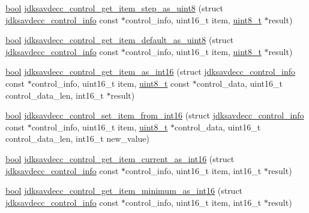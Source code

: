\begin{DoxyCompactItemize}
\item 
\hyperlink{avb__gptp_8h_af6a258d8f3ee5206d682d799316314b1}{bool} \hyperlink{group__aem__control__value__helpers_gad3f88597b663413b8204946fae28038c}{jdksavdecc\+\_\+control\+\_\+get\+\_\+item\+\_\+step\+\_\+as\+\_\+uint8} (struct \hyperlink{structjdksavdecc__control__info}{jdksavdecc\+\_\+control\+\_\+info} const $\ast$control\+\_\+info, uint16\+\_\+t item, \hyperlink{stdint_8h_aba7bc1797add20fe3efdf37ced1182c5}{uint8\+\_\+t} $\ast$result)
\item 
\hyperlink{avb__gptp_8h_af6a258d8f3ee5206d682d799316314b1}{bool} \hyperlink{group__aem__control__value__helpers_ga26f09817f181fa3492aac0c48be4594e}{jdksavdecc\+\_\+control\+\_\+get\+\_\+item\+\_\+default\+\_\+as\+\_\+uint8} (struct \hyperlink{structjdksavdecc__control__info}{jdksavdecc\+\_\+control\+\_\+info} const $\ast$control\+\_\+info, uint16\+\_\+t item, \hyperlink{stdint_8h_aba7bc1797add20fe3efdf37ced1182c5}{uint8\+\_\+t} $\ast$result)
\item 
\hyperlink{avb__gptp_8h_af6a258d8f3ee5206d682d799316314b1}{bool} \hyperlink{group__aem__control__value__helpers_ga62b54c4e6e3bea497cedd310f3c93012}{jdksavdecc\+\_\+control\+\_\+get\+\_\+item\+\_\+as\+\_\+int16} (struct \hyperlink{structjdksavdecc__control__info}{jdksavdecc\+\_\+control\+\_\+info} const $\ast$control\+\_\+info, uint16\+\_\+t item, \hyperlink{stdint_8h_aba7bc1797add20fe3efdf37ced1182c5}{uint8\+\_\+t} const $\ast$control\+\_\+data, uint16\+\_\+t control\+\_\+data\+\_\+len, int16\+\_\+t $\ast$result)
\item 
\hyperlink{avb__gptp_8h_af6a258d8f3ee5206d682d799316314b1}{bool} \hyperlink{group__aem__control__value__helpers_ga08c813f8d11cdc66b3524c523d40f5da}{jdksavdecc\+\_\+control\+\_\+set\+\_\+item\+\_\+from\+\_\+int16} (struct \hyperlink{structjdksavdecc__control__info}{jdksavdecc\+\_\+control\+\_\+info} const $\ast$control\+\_\+info, uint16\+\_\+t item, \hyperlink{stdint_8h_aba7bc1797add20fe3efdf37ced1182c5}{uint8\+\_\+t} $\ast$control\+\_\+data, uint16\+\_\+t control\+\_\+data\+\_\+len, int16\+\_\+t new\+\_\+value)
\item 
\hyperlink{avb__gptp_8h_af6a258d8f3ee5206d682d799316314b1}{bool} \hyperlink{group__aem__control__value__helpers_ga4bb3fda05a31332bbcbd459c99227a7c}{jdksavdecc\+\_\+control\+\_\+get\+\_\+item\+\_\+current\+\_\+as\+\_\+int16} (struct \hyperlink{structjdksavdecc__control__info}{jdksavdecc\+\_\+control\+\_\+info} const $\ast$control\+\_\+info, uint16\+\_\+t item, int16\+\_\+t $\ast$result)
\item 
\hyperlink{avb__gptp_8h_af6a258d8f3ee5206d682d799316314b1}{bool} \hyperlink{group__aem__control__value__helpers_ga881cc5c354b52ef558d5e7913f9c2722}{jdksavdecc\+\_\+control\+\_\+get\+\_\+item\+\_\+minimum\+\_\+as\+\_\+int16} (struct \hyperlink{structjdksavdecc__control__info}{jdksavdecc\+\_\+control\+\_\+info} const $\ast$control\+\_\+info, uint16\+\_\+t item, int16\+\_\+t $\ast$result)

\end{DoxyCompactItemize}
